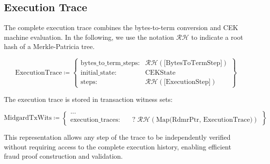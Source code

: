 \documentclass[../midgard.tex]{subfiles}
\begin{document}
\subsection{Execution Trace}

The complete execution trace combines the bytes-to-term conversion and CEK machine evaluation. In the following, we use the notation $\mathcal{RH}$ to indicate a root hash of a Merkle-Patricia tree. 

\begin{equation*}
    \text{ExecutionTrace} \coloneq \left\{
    \begin{array}{ll}
        \text{bytes\_to\_term\_steps} : & \mathcal{RH}(\text{[BytesToTermStep]}) \\
        \text{initial\_state} : & \text{CEKState} \\
        \text{steps} : & \mathcal{RH}(\text{[ExecutionStep]})
    \end{array} \right\}
\end{equation*}

The execution trace is stored in transaction witness sets:

\begin{equation*}
    \text{MidgardTxWits} \coloneq \left\{
    \begin{array}{ll}
        ... \\
        \text{execution\_traces} : & \quad?\;\mathcal{RH}(\text{Map(RdmrPtr, ExecutionTrace)})
    \end{array} \right\}
\end{equation*}

This representation allows any step of the trace to be independently verified without requiring access to the complete execution history, enabling efficient fraud proof construction and validation.
\end{document}
